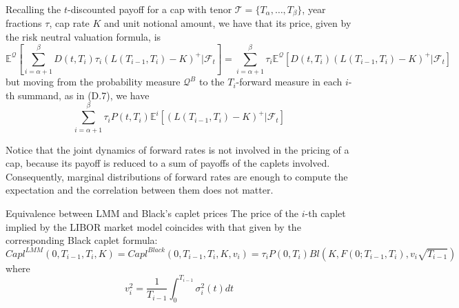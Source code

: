 \documentclass{beamer}
\begin{document}
\begin{frame}
	\begin{block}
	Recalling the $t$-discounted payoff for a cap with tenor $\mathcal{T} = \{T_\alpha,\ldots, T_\beta\}$, year fractions $\tau$, cap rate $K$ and unit notional amount, we have that its price, given by the risk neutral valuation formula, is
	\begin{equation}
	\mathbb{E}^\mathcal{Q}\left[\sum_{i=\alpha+1}^{\beta}D(t,T_i)\tau_i(L(T_{i-1},T_i)-K)^+|\mathcal{F}_t\right]=
	\sum_{i=\alpha+1}^{\beta}\tau_i\mathbb{E}^\mathcal{Q}[D(t,T_i)(L(T_{i-1},T_i)-K)^+|\mathcal{F}_t]
	\end{equation}
	but moving from the probability measure $\mathcal{Q}^B$ to the $T_i$-forward measure in each $i$-th summand, as in (D.7), we have
	\begin{equation}
		\sum_{i=\alpha+1}^{\beta}\tau_iP(t,T_i)\mathbb{E}^i[(L(T_{i-1},T_i)-K)^+|\mathcal{F}_t]
	\end{equation}
	\end{block}

Notice that the joint dynamics of forward rates is not involved in the pricing of a cap, because its payoff is reduced to a sum of payoffs of the caplets involved. Consequently, marginal distributions of forward rates are enough to compute the expectation and the correlation between them does not matter. %
\end{frame}

\begin{frame}
\begin{block}{Equivalence between LMM and Black’s caplet prices}
The price of the $i$-th caplet implied by the LIBOR market model coincides with that given by the corresponding Black caplet formula:
\begin{equation}
Capl^{LMM}(0, T_{i-1}, T_i, K) = Capl^{Black}(0, T_{i-1}, T_i, K, v_i)= \tau_i P(0, T_i) Bl(K, F(0; T_{i-1}, T_i), v_i\sqrt{T_{i-1}})
\end{equation}
where
\begin{equation}
v_i^2 = \frac{1}{T_{i-1}}\int_0^{T_{i-1}}\sigma_i^2(t)dt
\end{equation}
\end{block}
\end{frame}
\end{document}
